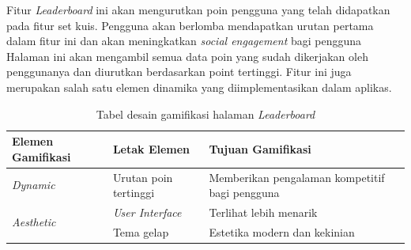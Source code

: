 Fitur \textit{Leaderboard} ini akan mengurutkan poin pengguna yang telah didapatkan pada fitur set kuis.
Pengguna akan berlomba mendapatkan urutan pertama dalam fitur ini dan akan meningkatkan \textit{social engagement} bagi pengguna
Halaman ini akan mengambil semua data poin yang sudah dikerjakan oleh penggunanya dan diurutkan berdasarkan point tertinggi.
Fitur ini juga merupakan salah satu elemen dinamika yang diimplementasikan dalam aplikas.
\begin{table}[H]
	\caption{Tabel desain gamifikasi halaman \textit{Leaderboard}}
	\label{TabelGameLeaderboard}
	\begin{tabular}{|m{3.6cm}|m{}|m{}|}
		\hline
		Elemen Gamifikasi& Letak Elemen & Tujuan Gamifikasi\\
		\hline
		\textit{Dynamic}&Urutan poin tertinggi&Memberikan pengalaman kompetitif bagi pengguna \\
		\hline
		\multirow{2}{1cm}{\textit{Aesthetic}}&\textit{User Interface}&Terlihat lebih menarik\\
		\cline{2-3}
		& Tema gelap & Estetika modern dan kekinian \\
		\hline
	\end{tabular}
\end{table}
